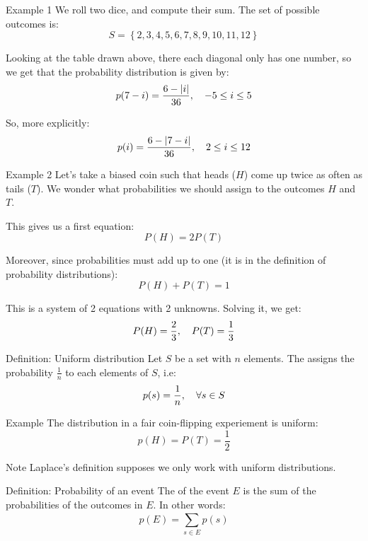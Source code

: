 \documentclass[a4paper]{article}
\begin{document}
\begin{parag}{Example 1}
    We roll two dice, and compute their sum. The set of possible outcomes is: 
    \[S = \left\{2, 3, 4, 5, 6, 7, 8, 9, 10, 11, 12\right\}\]

    Looking at the table drawn above, there each diagonal only has one number, so we get that the probability distribution is given by:
    \[p\left(7 - i\right) = \frac{6 - \left|i\right|}{36}, \mathspace -5 \leq i \leq 5\]

    So, more explicitly: 
    \[p\left(i\right) = \frac{6 - \left|7 - i\right|}{36}, \mathspace 2 \leq i \leq 12\]
\end{parag}

\begin{parag}{Example 2}
    Let's take a biased coin such that heads ($H$) come up twice as often as tails ($T$). We wonder what probabilities we should assign to the outcomes $H$ and $T$.

    This gives us a first equation: 
    \[P\left(H\right) = 2P\left(T\right)\]

    Moreover, since probabilities must add up to one (it is in the definition of probability distributions): 
    \[P\left(H\right) + P\left(T\right) = 1\]
    
    This is a system of 2 equations with 2 unknowns. Solving it, we get: 
    \[P\left(H\right) = \frac{2}{3}, \mathspace P\left(T\right) = \frac{1}{3}\]
    
\end{parag}

\begin{parag}{Definition: Uniform distribution}
    Let $S$ be a set with $n$ elements. The  assigns the probability $\frac{1}{n}$ to each elements of $S$, i.e: 
    \[p\left(s\right) = \frac{1}{n}, \mathspace \forall s \in S\]
    
    \begin{subparag}{Example}
        The distribution in a fair coin-flipping experiement is uniform: 
        \[p\left(H\right) = P\left(T\right) = \frac{1}{2}\]
    \end{subparag}

    \begin{subparag}{Note}
        Laplace's definition supposes we only work with uniform distributions.
    \end{subparag}
    
\end{parag}

\begin{parag}{Definition: Probability of an event}
    The  of the event $E$ is the sum of the probabilities of the outcomes in $E$. In other words: 
    \[p\left(E\right) = \sum_{s \in E}^{} p\left(s\right)\]
\end{parag}
\end{document}
